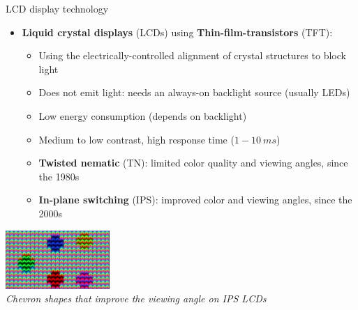 \begin{frame}{LCD display technology}
  \begin{itemize}
  \item \textbf{Liquid crystal displays} (LCDs) using \textbf{Thin-film-transistors} (TFT):
    \begin{itemize}
    \item Using the electrically-controlled alignment of crystal structures to block light
    \item Does not emit light: needs an always-on backlight source (usually LEDs)
    \item Low energy consumption (depends on backlight)
    \item Medium to low contrast, high response time (\(1-10~ms\))
    \item \textbf{Twisted nematic} (TN): limited color quality and viewing angles, since the 1980s
    \item \textbf{In-plane switching} (IPS): improved color and viewing angles, since the 2000s
    \end{itemize}
  \end{itemize}

  \begin{center}
  \includegraphics[height=6em]{slides/graphics-hardware/lcd-ips-shape.jpg}\\
  \textit{\small Chevron shapes that improve the viewing angle on IPS LCDs}
  \end{center}
\end{frame}

